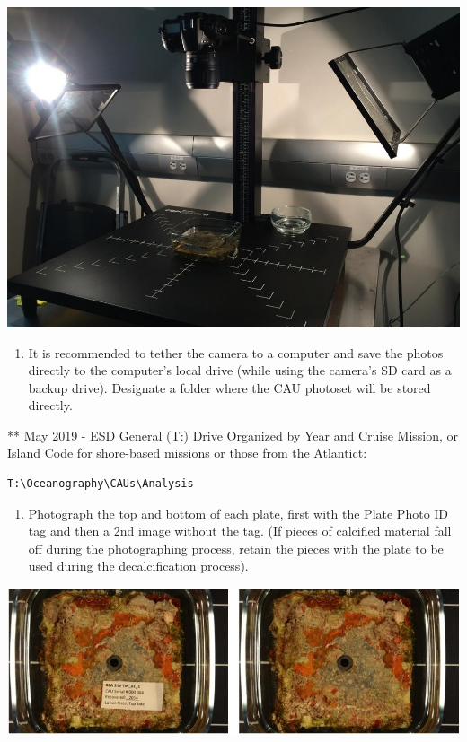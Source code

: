\documentclass[
]{book}
\providecommand{\tightlist}{%
  \setlength{\itemsep}{0pt}\setlength{\parskip}{0pt}}
\begin{document}
\includegraphics{images/CAU_photograph.jpg}

\begin{enumerate}
\def\labelenumi{\arabic{enumi}.}
\setcounter{enumi}{6}
\tightlist
\item
  It is recommended to tether the camera to a computer and save the photos directly to the computer's local drive (while using the camera's SD card as a backup drive). Designate a folder where the CAU photoset will be stored directly.
\end{enumerate}

** May 2019 - ESD General (T:) Drive Organized by Year and Cruise Mission, or Island Code for shore-based missions or those from the Atlantict:

\begin{verbatim}
T:\Oceanography\CAUs\Analysis  
\end{verbatim}

\begin{enumerate}
\def\labelenumi{\arabic{enumi}.}
\setcounter{enumi}{7}
\tightlist
\item
  Photograph the top and bottom of each plate, first with the Plate Photo ID tag and then a 2nd image without the tag. (If pieces of calcified material fall off during the photographing process, retain the pieces with the plate to be used during the decalcification process).
\end{enumerate}

\includegraphics{images/CAU_image.jpg}
\end{document}
